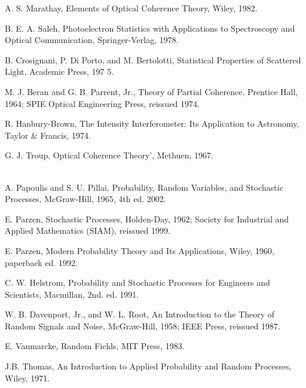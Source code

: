\documentclass[UTF8]{ctexart}
\numberwithin{figure}{subsection}
\numberwithin{table}{subsection}
\begin{document}
\begin{spacing}{0.5}
\begin{hangparas}{0.25cm}{1}
\par A. S. Marathay, Elements of Optical Coherence Theory, Wiley, 1982.\\
\par B. E. A. Saleh, Photoelectron Statistics with Applications to Spectroscopy and Optical Communication, Springer-Verlag, 1978.\\
\par B. Crosignani, P. Di Porto, and M. Bertolotti, Statistical Properties of Scattered Light, Academic
Press, 197 5.\\
\par M. J. Beran and G. B. Parrent, Jr., Theory of Partial Coherence, Prentice Hall, 1964; SPIE Optical
Engineering Press, reissued 1974.\\
\par R. Hanbury-Brown, The Intensity Interferometer: Its Application to Astronomy, Taylor \& Francis,
1974.\\
\par G. J. Troup, Optical Coherence Theory', Methuen, 1967.\\


\bigbreak{}\\
\par A. Papoulis and S. U. Pillai, Probability, Random Variables, and Stochastic Processes, McGraw-Hill,
1965, 4th ed. 2002.\\
\par E. Parzen, Stochastic Processes, Holden-Day, 1962; Society for Industrial and Applied Mathematics
(SIAM), reissued 1999.\\
\par E. Parzen, Modern Probability Theory and Its Applications, Wiley, 1960, paperback ed. 1992.\\
\par C. W. Helstrom, Probability and Stochastic Processes for Engineers and Scientists, Macmillan, 2nd.
ed. 1991.\\
\par W. B. Davenport, Jr., and W. L. Root, An Introduction to the Theory of Random Signals and Noise,
McGraw-Hill, 1958; IEEE Press, reissued 1987.\\
\par E. Vanmarcke, Random Fields, MIT Press, 1983.\\
\par J.B. Thomas, An Introduction to Applied Probability and Random Processes, Wiley, 1971.\\



\end{hangparas}
\end{spacing}
\end{document}
